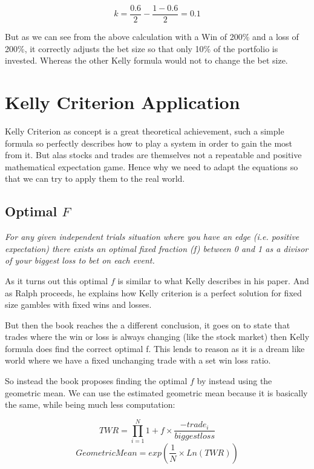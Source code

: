 \documentclass[12pt]{article}
\begin{document}
    \[k = \frac{0.6}{2} - \frac{1 - 0.6}{2} = 0.1\]

    But as we can see from the above calculation with a Win of 200\% and a loss of 200\%, it 
    correctly adjusts the bet size so that only 10\% of the portfolio is invested. Whereas the 
    other Kelly formula would not to change the bet size.

\section{Kelly Criterion Application}

    Kelly Criterion as concept is a great theoretical achievement, such a simple formula so
    perfectly describes how to play a system in order to gain the most from it. But alas
    stocks and trades are themselves not a repeatable and positive mathematical expectation
    game. Hence why we need to adapt the equations so that we can try to apply them to the
    real world.

\subsection{Optimal \(F\)}

    \begin{displayquote} \textit {
        For any given independent trials situation where you have an edge (i.e. positive 
        expectation) there exists an optimal fixed
        fraction (f) between 0 and 1 as a divisor of your biggest loss to bet on each event.
    } \end{displayquote}

    As it turns out this optimal \(f\) is similar to what Kelly describes in his paper. 
    And as Ralph proceeds, he explains how Kelly criterion is a perfect solution for 
    fixed size gambles with fixed wins and losses.

    But then the book reaches the a different conclusion, it goes on to state that trades where 
    the win or loss is always changing {(like the stock market)} then Kelly formula does find
    the correct optimal f. This lends to reason as it is a dream like world where we have a
    fixed unchanging trade with a set win loss ratio.

    So instead the book proposes finding the optimal \(f\) by instead using the geometric
    mean. We can use the estimated geometric mean because it is basically the same, while
    being much less computation:

    \begin{equation}\label{eq:TWR}
        TWR = \displaystyle\prod^{N}_{i=1}1 + f \times \frac{- trade_i}{biggest loss}
    \end{equation}
    \begin{equation}\label{eq:GeoMean}
        Geometric Mean = exp(\frac{1}{N} \times Ln(TWR))
    \end{equation}
\end{document}
